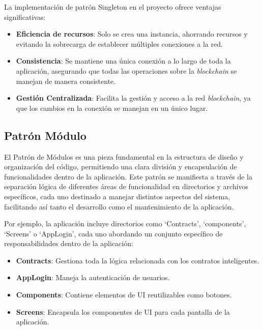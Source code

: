 La implementación de patrón Singleton en el proyecto ofrece ventajas significativas: 

\begin{itemize}
\item \textbf{Eficiencia de recursos}: Solo se crea una instancia, ahorrando recursos y evitando la sobrecarga de establecer múltiples conexiones a la red.

\item \textbf{Consistencia}: Se mantiene una única conexión a lo largo de toda la aplicación, asegurando que todas las operaciones sobre la \textit{blockchain} se manejan de manera consistente.

\item \textbf{Gestión Centralizada}: Facilita la gestión y acceso a la red \textit{blockchain}, ya que los cambios en la conexión se manejan en un único lugar.
\end{itemize}

\subsection{Patrón Módulo}

El Patrón de Módulos es una pieza fundamental en la estructura de diseño y organización del código, permitiendo una clara división y encapsulación de funcionalidades dentro de la aplicación. Este patrón se manifiesta a través de la separación lógica de diferentes áreas de funcionalidad en directorios y archivos específicos, cada uno destinado a manejar distintos aspectos del sistema, facilitando así tanto el desarrollo como el mantenimiento de la aplicación.

Por ejemplo, la aplicación incluye directorios como `Contracts', `components', `Screens' o `AppLogin', cada uno abordando un conjunto específico de responsabilidades dentro de la aplicación:

\begin{itemize}
\item \textbf{Contracts}: Gestiona toda la lógica relacionada con los contratos inteligentes.

\item \textbf{AppLogin}: Maneja la autenticación de usuarios.

\item \textbf{Components}: Contiene elementos de UI reutilizables como botones.

\item \textbf{Screens}: Encapsula los componentes de UI para cada pantalla de la aplicación.
\end{itemize}

